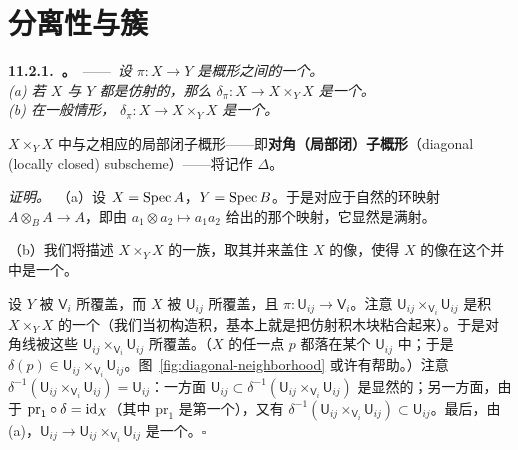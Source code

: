 
\section{分离性与簇}

\textbf{11.2.1.\ \trhProposition{}。}\ ——\ \emph{设 $\pi\colon X\to Y$ 是概形之间的一个\trMorphism。}\\
\emph{(a) 若 $X$ 与 $Y$ 都是仿射的，那么\trDiagonalMorphism{} $\delta_\pi\colon X\to X\times_Y X$ 是一个\trClosedEmbedding。}\\
\emph{(b) 在一般情形，\trDiagonalMorphism{} $\delta_\pi\colon X\to X\times_Y X$ 是一个\trLocallyClosedEmbedding。}

$X\times_Y X$ 中与之相应的局部闭子概形——即\textbf{对角（局部闭）子概形}（diagonal (locally closed) subscheme）——将记作 $\Delta$。

\emph{证明。}\ （a）设 $X=\operatorname{Spec} A$，$Y=\operatorname{Spec} B$。于是\trDiagonalMorphism{}对应于自然的环映射 $A\otimes_B A\to A$，即由 $a_1\otimes a_2\mapsto a_1a_2$ 给出的那个映射，它显然是满射。

（b）我们将描述 $X\times_Y X$ 的一族\trOpenSubset{}，取其并来盖住 $X$ 的像，使得 $X$ 的像在这个并中是一个\trClosedEmbedding。

设 $Y$ 被\trAffine\trOpenSet{} $\mathsf{V}_i$ 所覆盖，而 $X$ 被\trAffine\trOpenSet{} $\mathsf{U}_{ij}$ 所覆盖，且 $\pi\colon\mathsf{U}_{ij}\to\mathsf{V}_i$。注意 $\mathsf{U}_{ij}\times_{\mathsf{V}_i}\mathsf{U}_{ij}$ 是积 $X\times_Y X$ 的一个\trAffine\trOpenSubscheme（我们当初构造积，基本上就是把仿射积木块粘合起来）。于是对角线被这些\trAffine\trOpenSubset{} $\mathsf{U}_{ij}\times_{\mathsf{V}_i}\mathsf{U}_{ij}$ 所覆盖。（$X$ 的任一点 $p$ 都落在某个 $\mathsf{U}_{ij}$ 中；于是 $\delta(p)\in\mathsf{U}_{ij}\times_{\mathsf{V}_i}\mathsf{U}_{ij}$。图~\ref{fig:diagonal-neighborhood} 或许有帮助。）注意 $\delta^{-1}(\mathsf{U}_{ij}\times_{\mathsf{V}_i}\mathsf{U}_{ij})=\mathsf{U}_{ij}$：一方面 $\mathsf{U}_{ij}\subset\delta^{-1}(\mathsf{U}_{ij}\times_{\mathsf{V}_i}\mathsf{U}_{ij})$ 是显然的；另一方面，由于 $\mathrm{pr}_1\circ\delta=\mathrm{id}_X$（其中 $\mathrm{pr}_1$ 是第一个\trProjection），又有 $\delta^{-1}(\mathsf{U}_{ij}\times_{\mathsf{V}_i}\mathsf{U}_{ij})\subset\mathsf{U}_{ij}$。最后，由 (a)，$\mathsf{U}_{ij}\to\mathsf{U}_{ij}\times_{\mathsf{V}_i}\mathsf{U}_{ij}$ 是一个\trClosedEmbedding。\hfill$\square$


